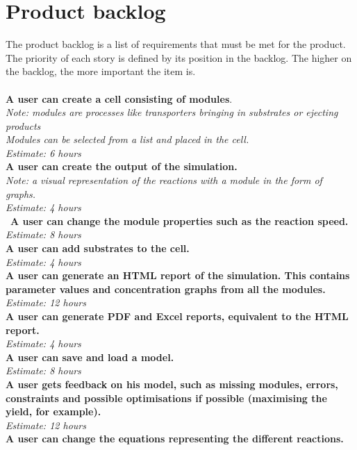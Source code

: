 \documentclass[10pt,a4paper]{report}
\begin{document}
	\section{Product backlog}
		The product backlog is a list of requirements that must be met for the product. The priority of each story is defined by its position in the backlog. The higher on the backlog, the more important the item is.\\
		\\
		\textbf{A user can create a cell consisting of modules}. \\
		\indent
			\textit{Note: modules are processes like transporters bringing in substrates or ejecting products\\
		\indent
			Modules can be selected from a list and placed in the cell.\\
		\indent
			Estimate: 6 hours} \\
		\textbf{A user can create the output of the simulation. }\\
		\indent
			\textit{Note: a visual representation of the reactions with a module in the form of graphs. \\
		\indent
			Estimate: 4 hours} \\\
		\textbf{A user can change the module properties such as the reaction speed.} \\
		\indent
			\emph{Estimate: 8 hours} \\
		\textbf{A user can add substrates to the cell.} \\
		\indent
			\emph{Estimate: 4 hours} \\
		\textbf{A user can generate an HTML report of the simulation. This contains parameter values and concentration graphs from all the modules.} \\
		\indent
			\emph{ Estimate: 12 hours} \\
		\textbf{A user can generate PDF and Excel reports, equivalent to the HTML report.} \\
		\indent
			\emph{Estimate: 4 hours} \\
		\textbf{A user can save and load a model.} \\
		\indent
			\emph{Estimate: 8 hours} \\
		\textbf{A user gets feedback on his model, such as missing modules, errors, constraints and possible optimisations if possible (maximising the yield, for example).} \\
		\indent
			\emph{Estimate: 12 hours} \\
		\textbf{A user can change the equations representing the different reactions.} \\
\end{document}
